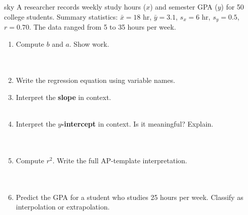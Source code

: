 \documentclass[10pt]{article}
\begin{document}
\namedateperiod

\vspace{0.14in}

\begin{scenariobox}{sky}
\small A researcher records weekly study hours ($x$) and semester GPA ($y$) for 50 college
students. Summary statistics: $\bar{x} = 18$ hr, $\bar{y} = 3.1$, $s_x = 6$ hr, $s_y = 0.5$,
$r = 0.70$. The data ranged from 5 to 35 hours per week.
\end{scenariobox}

\vspace{0.1in}

\begin{enumerate}[leftmargin=1.6em, itemsep=0.18in]

  \item Compute $b$ and $a$. Show work.\\[8pt]
        \writeline\\[3pt]\writeline\\[3pt]\writeline

  \item Write the regression equation using variable names.\\[8pt]
        \writeline

  \item Interpret the \textbf{slope} in context.\\[8pt]
        \writeline\\[3pt]\writeline

  \item Interpret the \textbf{$y$-intercept} in context. Is it meaningful? Explain.\\[8pt]
        \writeline\\[3pt]\writeline\\[3pt]\writeline

  \item Compute $r^2$. Write the full AP-template interpretation.\\[8pt]
        \writeline\\[3pt]\writeline\\[3pt]\writeline

  \item Predict the GPA for a student who studies 25 hours per week. Classify as interpolation
        or extrapolation.\\[8pt]
        \writeline\\[3pt]\writeline

\end{enumerate}
\end{document}

